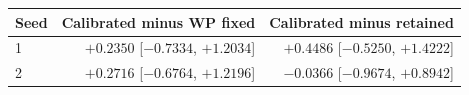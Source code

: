 \begin{tabular}{lrr}
\toprule
Seed & Calibrated minus WP fixed & Calibrated minus retained \\
\midrule
1 & $+0.2350$ [$-0.7334$, $+1.2034$] & $+0.4486$ [$-0.5250$, $+1.4222$] \\
2 & $+0.2716$ [$-0.6764$, $+1.2196$] & $-0.0366$ [$-0.9674$, $+0.8942$] \\
\bottomrule
\end{tabular}
